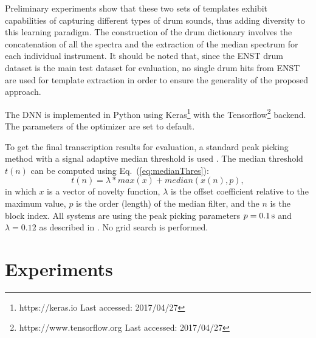 \documentclass{article}
\begin{document}
Preliminary experiments show that these two sets of templates exhibit capabilities of capturing different types of drum sounds, thus adding diversity to this learning paradigm. The construction of the drum dictionary involves the concatenation of all the spectra and the extraction of the median spectrum for each individual instrument. It should be noted that, since the ENST drum dataset is the main test dataset for evaluation, no single drum hits from ENST are used for template extraction in order to ensure the generality of the proposed approach.

The DNN is implemented in Python using Keras\footnote{https://keras.io Last accessed: 2017/04/27} with the Tensorflow\footnote{https://www.tensorflow.org Last accessed: 2017/04/27} backend. The parameters of the optimizer are set to default. 

To get the final transcription results for evaluation, a standard peak picking method with a signal adaptive median threshold is used \cite{Lerch2012}. The median threshold $t(n)$ can be computed using Eq.~(\ref{eq:medianThres}):
%
\begin{equation}\label{eq:medianThres}
t(n) = \lambda * max(x) + median(x(n), p) ,
\end{equation} 
in which $x$ is a vector of novelty function, $\lambda$ is the offset coefficient relative to the maximum value, $p$ is the order (length) of the median filter, and the $n$ is the block index. All systems are using the peak picking parameters $p = \unit[0.1]{s}$ and $\lambda = 0.12$ as described in \cite{Wu2015a}. No grid search is performed.  






\section{Experiments}\label{sec:experiments}
\end{document}

